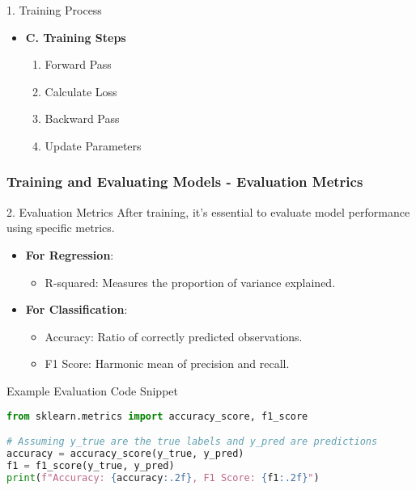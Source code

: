 \documentclass[aspectratio=169]{beamer}
\begin{document}
\begin{frame}[fragile]
\begin{block}{1. Training Process}
\begin{itemize}
\begin{itemize}
\begin{itemize}
                        \end{itemize}
                \end{itemize}
            \item \textbf{C. Training Steps}
                \begin{enumerate}
                    \item Forward Pass
                    \item Calculate Loss
                    \item Backward Pass
                    \item Update Parameters
                \end{enumerate}
        \end{itemize}
    \end{block}
\end{frame}

\begin{frame}[fragile]
    \frametitle{Training and Evaluating Models - Evaluation Metrics}
    \begin{block}{2. Evaluation Metrics}
        After training, it's essential to evaluate model performance using specific metrics.
        \begin{itemize}
            \item \textbf{For Regression}:
                \begin{itemize}
                    \item R-squared: Measures the proportion of variance explained.
                \end{itemize}
            \item \textbf{For Classification}:
                \begin{itemize}
                    \item Accuracy: Ratio of correctly predicted observations.
                    \item F1 Score: Harmonic mean of precision and recall.
                \end{itemize}
        \end{itemize}
    \end{block}
    \begin{block}{Example Evaluation Code Snippet}
    \begin{lstlisting}[language=Python]
from sklearn.metrics import accuracy_score, f1_score

# Assuming y_true are the true labels and y_pred are predictions
accuracy = accuracy_score(y_true, y_pred)
f1 = f1_score(y_true, y_pred)
print(f"Accuracy: {accuracy:.2f}, F1 Score: {f1:.2f}")
    \end{lstlisting}
    \end{block}
\end{frame}
\end{document}
